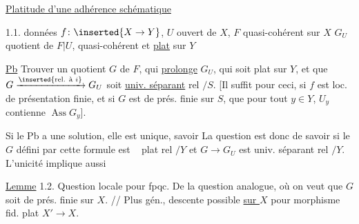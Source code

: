 \uline{Platitude d'une adhérence schématique}

1.1.
données $f\colon\inserted{X\to Y}$, $U$ ouvert  de $X$, $F$ quasi-cohérent sur $X$
$G_U$ quotient de $F|U$, quasi-cohérent et \uline{plat} sur $Y$

\uline{Pb} Trouver un quotient  $G$ de $F$, qui \uline{prolonge}
$G_U$,  qui soit plat sur $Y$, et  que
 $G\xrightarrow{\inserted{\text{rel. à }i}}G_U$ \inserted{$[\,G\to i_*(G_U)$} soit \uline{univ. séparant} rel $/S$.
[Il  suffit pour
ceci,  si $f$ est loc. de présentation finie, et si
 $G$ est de prés. finie sur $S$, que
pour tout $y\in Y$, $U_y$ contienne $\operatorname{Ass}G_y$].


Si le Pb a une solution, elle est unique,
savoir
La question est donc de savoir si le $G$ défini par cette formule
est \  plat rel $/Y$ et $G\to G_U$ est
univ.  séparant rel $/Y$. 
L'unicité implique
aussi

\uline{Lemme} 1.2. Question locale  pour fpqc. De  la
question analogue, où on veut que $G$ soit  de
prés. finie sur $X$. // Plus gén., descente possible \uline{sur $X$} pour morphisme fid. plat  $X'\to X$.

